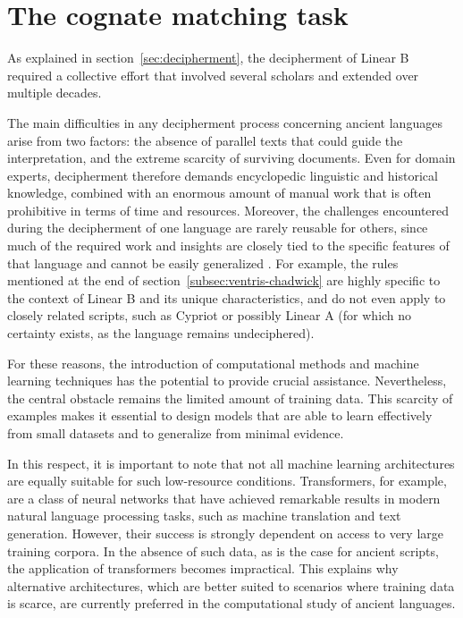 \chapter{The cognate matching task}
As explained in section~\ref{sec:decipherment}, the decipherment of Linear B required a collective effort that involved several scholars and extended over multiple decades.

The main difficulties in any decipherment process concerning ancient languages arise from two factors: the absence of parallel texts that could guide the interpretation, and the extreme scarcity of surviving documents.
Even for domain experts, decipherment therefore demands encyclopedic linguistic and historical knowledge, combined with an enormous amount of manual work that is often prohibitive in terms of time and resources. 
Moreover, the challenges encountered during the decipherment of one language are rarely reusable for others, since much of the required work and insights are closely tied to the specific features of that language and cannot be easily generalized \cite{luo}. 
For example, the rules mentioned at the end of section~\ref{subsec:ventris-chadwick} are highly specific to the context of Linear B and its unique characteristics, and do not even apply to closely related scripts, such as Cypriot or possibly Linear A (for which no certainty exists, as the language remains undeciphered).  

For these reasons, the introduction of computational methods and machine learning techniques has the potential to provide crucial assistance.
Nevertheless, the central obstacle remains the limited amount of training data.
This scarcity of examples makes it essential to design models that are able to learn effectively from small datasets and to generalize from minimal evidence.

In this respect, it is important to note that not all machine learning architectures are equally suitable for such low-resource conditions.  
Transformers, for example, are a class of neural networks that have achieved remarkable results in modern natural language processing tasks, such as machine translation and text generation.  
However, their success is strongly dependent on access to very large training corpora.
In the absence of such data, as is the case for ancient scripts, the application of transformers becomes impractical.
This explains why alternative architectures, which are better suited to scenarios where training data is scarce, are currently preferred in the computational study of ancient languages.

